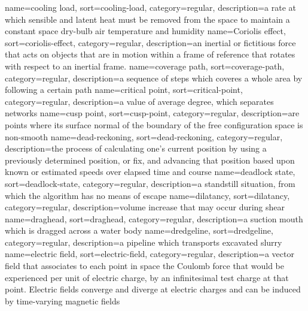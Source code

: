 %
{%
  name={cooling load},%
  sort={cooling-load},%
  category={regular},%
  description={a rate at which sensible and latent heat must be removed from the space to maintain a constant space dry-bulb air temperature and humidity}%
}
%
{%
  name={Coriolis effect},%
  sort={coriolis-effect},%
  category={regular},%
  description={an inertial or fictitious force that acts on objects that are in motion within a frame of reference that rotates with respect to an inertial frame.}%
}
%
{%
  name={coverage path},%
  sort={coverage-path},%
  category={regular},%
  description={a sequence of steps which coveres a whole area by following a certain path}%
}
%
{%
  name={critical point},%
  sort={critical-point},%
  category={regular},%
  description={a value of average degree, which separates networks}%
}
%
{%
  name={cusp point},%
  sort={cusp-point},%
  category={regular},%
  description={are points where its surface normal of the boundary of the free configuration space is non-smooth}%
}
%
{%
  name={dead-reckoning},%
  sort={dead-reckoning},%
  category={regular},%
  description={the process of calculating one's current position by using a previously determined position, or fix, and advancing that position based upon known or estimated speeds over elapsed time and course}%
}
%
{%
  name={deadlock state},%
  sort={deadlock-state},%
  category={regular},%
  description={a standstill situation, from which the algorithm has no means of escape}%
}
%
{%
  name={dilatancy},%
  sort={dilatancy},%
  category={regular},%
  description={volume increase that may occur during shear}%
}
%
{%
  name={draghead},%
  sort={draghead},%
  category={regular},%
  description={a suction mouth which is dragged across a water body}%
}
%
{%
  name={dredgeline},%
  sort={dredgeline},%
  category={regular},%
  description={a pipeline which transports excavated slurry}%
}
%
{%
  name={electric field},%
  sort={electric-field},%
  category={regular},%
  description={a vector field that associates to each point in space the Coulomb force that would be experienced per unit of electric charge, by an infinitesimal test charge at that point. Electric fields converge and diverge at electric charges and can be induced by time-varying magnetic fields}%
}
